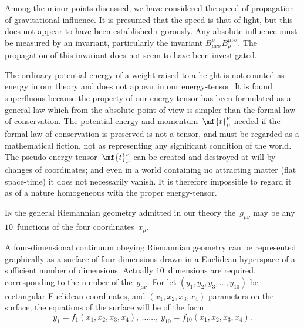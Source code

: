 \documentclass[12pt]{book}
\begin{document}
Among the minor points discussed, we have considered the speed of propagation
of gravitational influence. It is presumed that the speed is that
of light, but this does not appear to have been established rigorously. Any
absolute influence must be measured by an invariant, particularly the invariant
$B_{\mu\nu\sigma}^{\rho} B_{\rho}^{\mu\nu\sigma}$. The propagation of this invariant does not seem to have
been investigated.

The ordinary potential energy of a weight raised to a height is not counted
%
as energy in our theory and does not appear in our energy-tensor. It is found
superfluous because the property of our energy-tensor has been formulated
as a general law which from the absolute point of view is simpler than the
formal law of conservation. The potential energy and momentum~$\mf{t}_{\mu}^{\nu}$ needed
if the formal law of conservation is preserved is not a tensor, and must be
regarded as a mathematical fiction, not as representing any significant condition
of the world. The pseudo-energy-tensor~$\mf{t}_{\mu}^{\nu}$ can be created and destroyed
at will by changes of coordinates; and even in a world containing no attracting
matter (flat space-time) it does not necessarily vanish. It is therefore impossible
to regard it as of a nature homogeneous with the proper energy-tensor.

%


\lettrine{I}{n} the general Riemannian geometry admitted in our theory the~$g_{\mu\nu}$ may
be any $10$~functions of the four coordinates~$x_{\mu}$.

A four-dimensional continuum obeying Riemannian geometry can be
represented graphically as a surface of four dimensions drawn in a Euclidean
hyperspace of a sufficient number of dimensions. Actually $10$~dimensions are
required, corresponding to the number of the~$g_{\mu\nu}$. For let $(y_{1}, y_{2}, y_{3}, \dots, y_{10})$ be
rectangular Euclidean coordinates, and $(x_{1}, x_{2}, x_{3}, x_{4})$ parameters on the surface;
the equations of the surface will be of the form
\[
y_{1} = f_{1}(x_{1}, x_{2}, x_{3}, x_{4}),\ \dots\dots,\
y_{10} = f_{10}(x_{1}, x_{2}, x_{3}, x_{4}).
\]
\end{document}
